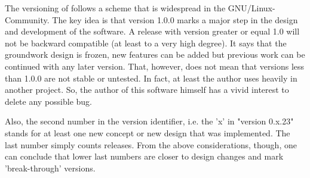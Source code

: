 The versioning of {\quex} follows a scheme that is widespread in the
GNU/Linux-Community. The key idea is that version 1.0.0 marks a major step in
the design and development of the software. A {\quex} release with version
greater or equal 1.0 will not be backward compatible (at least to a very high
degree). It says that the groundwork design is frozen, new features can be
added but previous work can be continued with any later version. That,
however, does not mean that versions less than 1.0.0 are not stable or
untested. In fact, at least the author uses {\quex} heavily in another
project. So, the author of this software himself has a vivid interest to
delete any possible bug. 

Also, the second number in the version identifier, i.e. the 'x' in "version
0.x.23" stands for at least one new concept or new design that was
implemented. The last number simply counts releases. From the above
considerations, though, one can conclude that lower last numbers are closer to
design changes and mark 'break-through' versions. 



